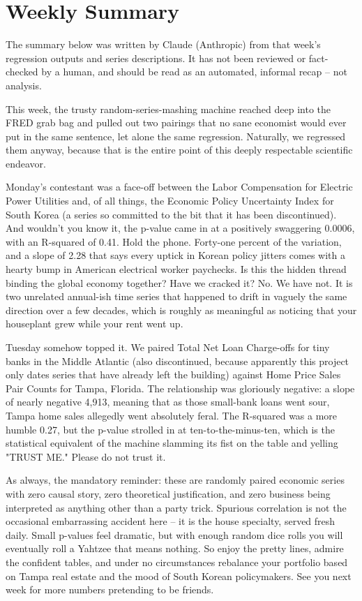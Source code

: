 \section{Weekly Summary}

\begin{tcolorbox}[colback=yellow!10,colframe=black!50,title=AI-Generated Content]
\noindent The summary below was written by Claude (Anthropic) from that week's regression outputs and series descriptions. It has not been reviewed or fact-checked by a human, and should be read as an automated, informal recap -- not analysis.
\end{tcolorbox}

This week, the trusty random-series-mashing machine reached deep into the FRED grab bag and pulled out two pairings that no sane economist would ever put in the same sentence, let alone the same regression. Naturally, we regressed them anyway, because that is the entire point of this deeply respectable scientific endeavor.

Monday's contestant was a face-off between the Labor Compensation for Electric Power Utilities and, of all things, the Economic Policy Uncertainty Index for South Korea (a series so committed to the bit that it has been discontinued). And wouldn't you know it, the p-value came in at a positively swaggering 0.0006, with an R-squared of 0.41. Hold the phone. Forty-one percent of the variation, and a slope of 2.28 that says every uptick in Korean policy jitters comes with a hearty bump in American electrical worker paychecks. Is this the hidden thread binding the global economy together? Have we cracked it? No. We have not. It is two unrelated annual-ish time series that happened to drift in vaguely the same direction over a few decades, which is roughly as meaningful as noticing that your houseplant grew while your rent went up.

Tuesday somehow topped it. We paired Total Net Loan Charge-offs for tiny banks in the Middle Atlantic (also discontinued, because apparently this project only dates series that have already left the building) against Home Price Sales Pair Counts for Tampa, Florida. The relationship was gloriously negative: a slope of nearly negative 4,913, meaning that as those small-bank loans went sour, Tampa home sales allegedly went absolutely feral. The R-squared was a more humble 0.27, but the p-value strolled in at ten-to-the-minus-ten, which is the statistical equivalent of the machine slamming its fist on the table and yelling "TRUST ME." Please do not trust it.

As always, the mandatory reminder: these are randomly paired economic series with zero causal story, zero theoretical justification, and zero business being interpreted as anything other than a party trick. Spurious correlation is not the occasional embarrassing accident here -- it is the house specialty, served fresh daily. Small p-values feel dramatic, but with enough random dice rolls you will eventually roll a Yahtzee that means nothing. So enjoy the pretty lines, admire the confident tables, and under no circumstances rebalance your portfolio based on Tampa real estate and the mood of South Korean policymakers. See you next week for more numbers pretending to be friends.
